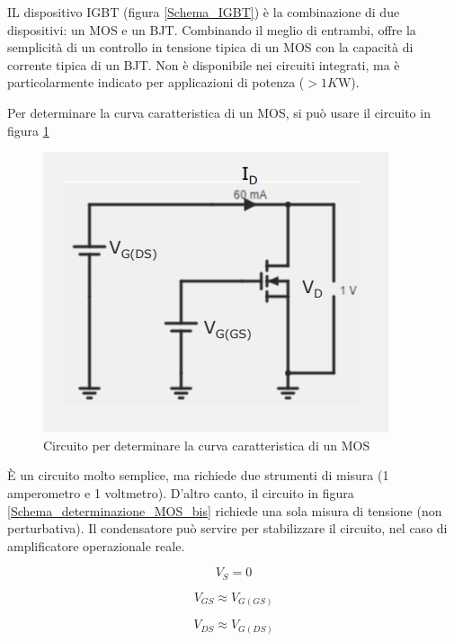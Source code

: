 \documentclass{article}
\begin{document}
IL dispositivo IGBT (figura \ref{Schema_IGBT}) è la combinazione di due dispositivi: un MOS e un BJT. Combinando il meglio di entrambi, offre la semplicità di un controllo in tensione tipica di un MOS con la capacità di corrente tipica di un BJT. Non è disponibile nei circuiti integrati, ma è particolarmente indicato per applicazioni di potenza ($> 1 K$W).

\vspace{3mm}

Per determinare la curva caratteristica di un MOS, si può usare il circuito in figura \ref{Schema_determinazione_MOS}

\begin{figure}[h]
  \centering
  \includegraphics[scale=0.55]{IM_determinazione_MOS}
  \caption{Circuito per determinare la curva caratteristica di un MOS}
  \label{Schema_determinazione_MOS}
\end{figure}

È un circuito molto semplice, ma richiede due strumenti di misura (1 amperometro e 1 voltmetro). D'altro canto, il circuito in figura \ref{Schema_determinazione_MOS_bis} richiede una sola misura di tensione (non perturbativa). Il condensatore può servire per stabilizzare il circuito, nel caso di amplificatore operazionale reale.

\[V_S = 0\]

\[V_{GS} \approx V_{G(GS)}\]

\[V_{DS} \approx V_{G(DS)}\]
\end{document}
